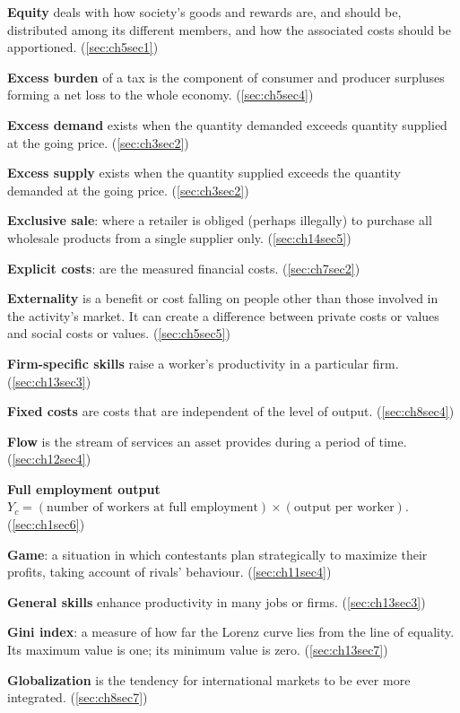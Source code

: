 \textbf{Equity} deals with how society's goods and rewards are, and should be, distributed among its different members, and how the associated costs should be apportioned. (\ref{sec:ch5sec1})

\textbf{Excess burden} of a tax is the component of consumer and producer surpluses forming a net loss to the whole economy. (\ref{sec:ch5sec4})

\textbf{Excess demand} exists when the quantity demanded exceeds quantity supplied at the going price. (\ref{sec:ch3sec2})

\textbf{Excess supply} exists when the quantity supplied exceeds the quantity demanded at the going price. (\ref{sec:ch3sec2})

\textbf{Exclusive sale}: where a retailer is obliged (perhaps illegally) to purchase all wholesale products from a single supplier only. (\ref{sec:ch14sec5})

\textbf{Explicit costs}: are the measured financial costs. (\ref{sec:ch7sec2})

\textbf{Externality} is a benefit or cost falling on people other than those involved in the activity's market. It can create a difference between private costs or values and social costs or values. (\ref{sec:ch5sec5})

\textbf{Firm-specific skills} raise a worker's productivity in a particular firm. (\ref{sec:ch13sec3})

\textbf{Fixed costs} are costs that are independent of the level of output. (\ref{sec:ch8sec4})

\textbf{Flow} is the stream of services an asset provides during a period of time. (\ref{sec:ch12sec4})

\textbf{Full employment output} $Y_c=(\text{number of workers at full employment})\times(\text{output per worker})$. (\ref{sec:ch1sec6})

\textbf{Game}: a situation in which contestants plan strategically to maximize their profits, taking account of rivals' behaviour. (\ref{sec:ch11sec4})

\textbf{General skills} enhance productivity in many jobs or firms. (\ref{sec:ch13sec3})

\textbf{Gini index}: a measure of how far the Lorenz curve lies from the line of equality. Its maximum value is one; its minimum value is zero. (\ref{sec:ch13sec7})

\textbf{Globalization} is the tendency for international markets to be ever more integrated. (\ref{sec:ch8sec7})

